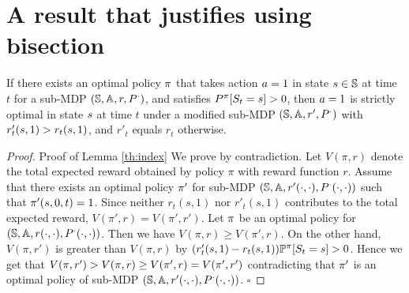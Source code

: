 \section{A result that justifies using bisection}\label{ap:bisect}
\begin{lemma}\label{th:index}
If there exists an optimal policy $\pi$ that takes action $a=1$ in state $s\in\mathbb{S}$ at time $t$ for a sub-MDP $(\mathbb{S},\mathbb{A},r,P^{\cdot})$, and satisfies $P^{\pi}[S_t=s]>0$, then $a=1$ is strictly optimal in state $s$ at time $t$ under a modified sub-MDP $(\mathbb{S},\mathbb{A},r',P^{\cdot})$ with $r'_t(s,1)>r_t(s,1)$, and $r'_t$ equals $r_t$ otherwise.
\end{lemma}
\begin{proof}{Proof of Lemma \ref{th:index}}
We prove by contradiction. Let $V(\pi,r)$ denote the total expected reward obtained by policy $\pi$ with reward function $r$. Assume that there exists an optimal policy $\pi'$ for sub-MDP $(\mathbb{S},\mathbb{A},r'(\cdot,\cdot),P^{\cdot}(\cdot,\cdot))$ such that $\pi'(s,0,t)=1$. Since neither $r_t(s,1)$ nor $r'_t(s,1)$ contributes to the total expected reward, $V(\pi',r)=V(\pi',r')$. Let $\pi$ be an optimal policy for $(\mathbb{S},\mathbb{A},r(\cdot,\cdot),P^{\cdot}(\cdot,\cdot))$. Then we have $V(\pi,r)\geq V(\pi',r)$. 
On the other hand, $V(\pi,r')$ is greater than $V(\pi,r)$ by $(r'_t(s,1)-r_t(s,1))\mathbb{P}^{\pi}[S_t=s]>0$. Hence we get that $V(\pi,r')>V(\pi,r)\geq V(\pi',r)=V(\pi',r')$ contradicting that $\pi'$ is an optimal policy of sub-MDP $(\mathbb{S},\mathbb{A},r'(\cdot,\cdot),P^{\cdot}(\cdot,\cdot))$. $\square$
\end{proof}

